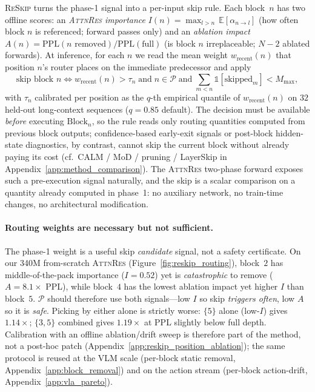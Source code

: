 \documentclass{article}
\newcommand{\attnres}{\textsc{AttnRes}}
\newcommand{\reskip}{\textsc{ReSkip}}
\newcommand{\E}{\mathbb{E}}
\begin{document}
\reskip{} turns the phase-1 signal into a per-input skip rule. Each block~$n$ has two offline scores: an \emph{\attnres{} importance} $I(n) = \max_{l > n}\,\E[\alpha_{n \to l}]$ (how often block $n$ is referenced; forward passes only) and an \emph{ablation impact} $A(n) = \mathrm{PPL}(\text{$n$ removed}) / \mathrm{PPL}(\text{full})$ (is block $n$ irreplaceable; $N{-}2$ ablated forwards). At inference, for each $n$ we read the mean weight $w_{\text{recent}}(n)$ that position $n$'s router places on the immediate predecessor and apply
\begin{equation}
  \text{skip block $n$} \iff
  w_{\text{recent}}(n) > \tau_n
  \;\text{and}\;
  n \in \mathcal{P}
  \;\text{and}\;
  \textstyle\sum_{m<n} \mathbb{1}[\text{skipped}_m] < M_{\max} ,
  \label{eq:skip_rule}
\end{equation}
with $\tau_n$ calibrated per position as the $q$-th empirical quantile of $w_{\text{recent}}(n)$ on $32$ held-out long-context sequences ($q{=}0.85$ default). The decision must be available \emph{before} executing $\mathrm{Block}_n$, so the rule reads only routing quantities computed from previous block outputs; confidence-based early-exit signals or post-block hidden-state diagnostics, by contrast, cannot skip the current block without already paying its cost (cf.\ CALM / MoD / pruning / LayerSkip in Appendix~\ref{app:method_comparison}). The \attnres{} two-phase forward exposes such a pre-execution signal naturally, and the skip is a scalar comparison on a quantity already computed in phase~1: no auxiliary network, no train-time changes, no architectural modification.

\paragraph{Routing weights are necessary but not sufficient.} The phase-1 weight is a useful skip \emph{candidate} signal, not a safety certificate. On our 340M from-scratch \attnres{} (Figure~\ref{fig:reskip_routing}), block~$2$ has middle-of-the-pack importance ($I{=}0.52$) yet is \emph{catastrophic} to remove ($A{=}8.1\times$ PPL), while block~$4$ has the lowest ablation impact yet higher $I$ than block~$5$. $\mathcal{P}$ should therefore use both signals---low $I$ so skip \emph{triggers often}, low $A$ so it is \emph{safe}. Picking by either alone is strictly worse: $\{5\}$ alone (low-$I$) gives $1.14\times$; $\{3,5\}$ combined gives $1.19\times$ at PPL slightly below full depth. Calibration with an offline ablation/drift sweep is therefore part of the method, not a post-hoc patch (Appendix~\ref{app:reskip_position_ablation}); the same protocol is reused at the VLM scale (per-block static removal, Appendix~\ref{app:block_removal}) and on the action stream (per-block action-drift, Appendix~\ref{app:vla_pareto}).
\end{document}
